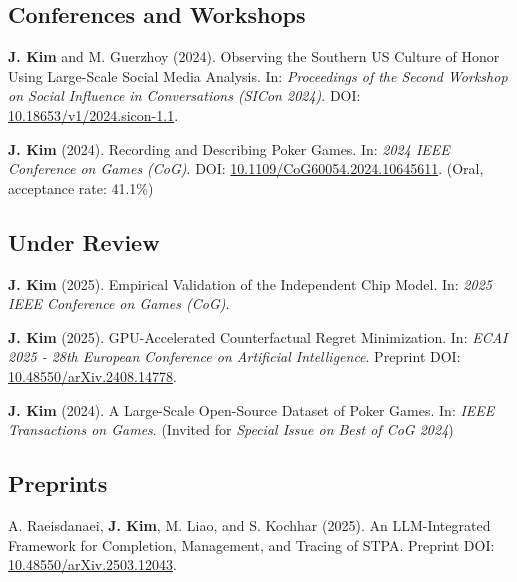 \documentclass{article}
\begin{document}
	\subsection*{Conferences and Workshops}

	\begin{etaremune}
		\item \textbf{J. Kim} and M. Guerzhoy (2024). Observing the Southern US Culture of Honor Using Large-Scale Social Media Analysis. In: \textit{Proceedings of the Second Workshop on Social Influence in Conversations (SICon 2024)}. {\small DOI: \href{https://doi.org/10.18653/v1/2024.sicon-1.1}{10.18653/v1/2024.sicon-1.1}.}
		\item \textbf{J. Kim} (2024). Recording and Describing Poker Games. In: \textit{2024 IEEE Conference on Games (CoG)}. {\small DOI: \href{https://doi.org/10.1109/CoG60054.2024.10645611}{10.1109/CoG60054.2024.10645611}. (Oral, acceptance rate: 41.1\%)}
	\end{etaremune}

	\subsection*{Under Review}

	\begin{etaremune}
		\item \textbf{J. Kim} (2025). Empirical Validation of the Independent Chip Model. In: \textit{2025 IEEE Conference on Games (CoG)}.
		\iftoggle{verbose}{
			\item \textbf{J. Kim} (2025). Racialization of the Democratic Peace in Foundational Embedding Models. In: \textit{Political Science Research and Methods}.
		}{}
		\item \textbf{J. Kim} (2025). GPU-Accelerated Counterfactual Regret Minimization. In: \textit{ECAI 2025 - 28th European Conference on Artificial Intelligence}. {\small Preprint DOI: \href{https://doi.org/10.48550/arXiv.2408.14778}{10.48550/arXiv.2408.14778}.}
		\item \textbf{J. Kim} (2024). A Large-Scale Open-Source Dataset of Poker Games. In: \textit{IEEE Transactions on Games}. {\small (Invited for \textit{Special Issue on Best of CoG 2024})}
	\end{etaremune}

	\subsection*{Preprints}

	\begin{etaremune}
		\item A. Raeisdanaei, \textbf{J. Kim}, M. Liao, and S. Kochhar (2025). An LLM-Integrated Framework for Completion, Management, and Tracing of STPA. {\small Preprint DOI: \href{https://doi.org/10.48550/arXiv.2503.12043}{10.48550/arXiv.2503.12043}.}
		\iftoggle{verbose}{
			\item \textbf{J. Kim} (2025). An LLM-Integrated Framework for Completion, Management, and Tracing of STPA. {\small Preprint DOI: \href{https://doi.org/10.48550/arXiv.2503.12043}{10.48550/arXiv.2503.12043}.}
		}{}
	\end{etaremune}
\end{document}
